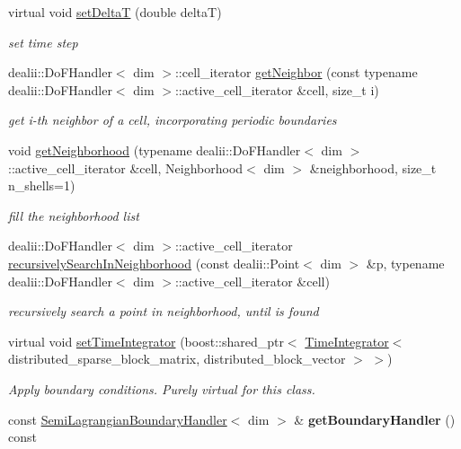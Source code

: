 \begin{DoxyCompactItemize}
\item 
virtual void \hyperlink{classnatrium_1_1SemiLagrangian_abd17b628b89c43303d067c0a4e4d0bf1}{setDeltaT} (double deltaT)
\begin{DoxyCompactList}\small\item\em set time step \item\end{DoxyCompactList}\item 
dealii::DoFHandler$<$ dim $>$::cell\_\-iterator \hyperlink{classnatrium_1_1SemiLagrangian_a5e70ea981e2070d5e9657f3df8d61979}{getNeighbor} (const typename dealii::DoFHandler$<$ dim $>$::active\_\-cell\_\-iterator \&cell, size\_\-t i)
\begin{DoxyCompactList}\small\item\em get i-\/th neighbor of a cell, incorporating periodic boundaries \item\end{DoxyCompactList}\item 
void \hyperlink{classnatrium_1_1SemiLagrangian_a511a39fcd3f598bd42c18deeb50cd7f5}{getNeighborhood} (typename dealii::DoFHandler$<$ dim $>$::active\_\-cell\_\-iterator \&cell, Neighborhood$<$ dim $>$ \&neighborhood, size\_\-t n\_\-shells=1)
\begin{DoxyCompactList}\small\item\em fill the neighborhood list \item\end{DoxyCompactList}\item 
dealii::DoFHandler$<$ dim $>$::active\_\-cell\_\-iterator \hyperlink{classnatrium_1_1SemiLagrangian_a8d075c2ae01b26d66999782cc14c5515}{recursivelySearchInNeighborhood} (const dealii::Point$<$ dim $>$ \&p, typename dealii::DoFHandler$<$ dim $>$::active\_\-cell\_\-iterator \&cell)
\begin{DoxyCompactList}\small\item\em recursively search a point in neighborhood, until is found \item\end{DoxyCompactList}\item 
virtual void \hyperlink{classnatrium_1_1SemiLagrangian_ac11ac59a28176a74e94fde81362ce7b5}{setTimeIntegrator} (boost::shared\_\-ptr$<$ \hyperlink{classnatrium_1_1TimeIntegrator}{TimeIntegrator}$<$ distributed\_\-sparse\_\-block\_\-matrix, distributed\_\-block\_\-vector $>$ $>$)
\begin{DoxyCompactList}\small\item\em Apply boundary conditions. Purely virtual for this class. \item\end{DoxyCompactList}\item 
\hypertarget{classnatrium_1_1SemiLagrangian_ac644f8378ee6bd26ff24eb025a60dda0}{
const \hyperlink{classnatrium_1_1SemiLagrangianBoundaryHandler}{SemiLagrangianBoundaryHandler}$<$ dim $>$ \& {\bfseries getBoundaryHandler} () const }
\label{classnatrium_1_1SemiLagrangian_ac644f8378ee6bd26ff24eb025a60dda0}


\end{DoxyCompactItemize}
